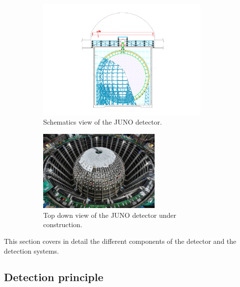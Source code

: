 \documentclass[../main.tex]{subfiles}
\begin{document}
\begin{figure}[ht]
  \centering
  \begin{subfigure}[b]{0.45\textwidth}
    \centering
    \includegraphics[height=6cm]{images/juno/drawing_schema.png}
    \caption{Schematics view of the JUNO detector.}
    \label{fig:juno:juno-schema}
  \end{subfigure}
  \hfill
  \begin{subfigure}[b]{0.45\textwidth}
    \centering
    \includegraphics[height=4cm]{images/juno/top_down_view.jpg}
    \caption{Top down view of the JUNO detector under construction.}
  \end{subfigure}
  \caption{}
\end{figure}

This section covers in detail the different components of the detector and the detection systems.

\subsection{Detection principle}
\label{sec:juno:detct}
\end{document}
